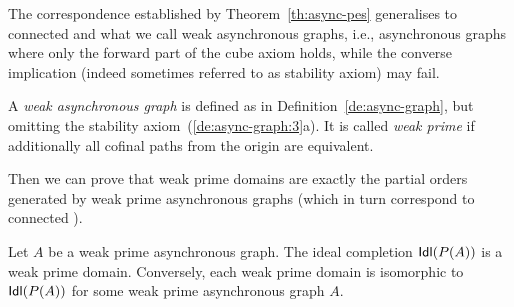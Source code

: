 The correspondence established by Theorem~\ref{th:async-pes}
generalises to connected {\esabbr} and what we call weak
asynchronous graphs, i.e., asynchronous graphs where only the forward
part of the cube axiom holds, while the converse implication (indeed
sometimes referred to as stability axiom) may fail.

\begin{definition}
  A \emph{weak asynchronous graph} is defined as in
  Definition~\ref{de:async-graph}, but omitting the stability
  axiom~(\ref{de:async-graph:3}a). It is called \emph{weak prime} if
  additionally all cofinal paths from the origin are equivalent.
\end{definition}

Then we can prove that weak prime domains are exactly the partial
orders generated by weak prime asynchronous graphs (which in turn
correspond to connected {\esabbr}).

\begin{proposition}
  \label{pr:was-ces}
  Let $A$ be a weak prime asynchronous graph. The ideal completion
  $\mathsf{Idl}({P(A)})$ is a weak prime domain. Conversely, each weak
  prime domain is isomorphic to $\mathsf{Idl}({P(A)})$ for some weak prime
  asynchronous graph $A$.
\end{proposition}

